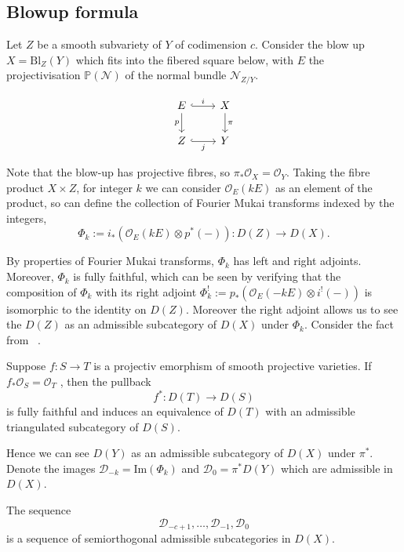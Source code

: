 \subsection{Blowup formula}

Let $Z$ be a smooth subvariety of $Y$ of codimension $c$. Consider the blow up $X = \mathrm{Bl}_{Z}(Y)$ which fits into the fibered square below, with $E$ the projectivisation $\mathbb{P} (\mathcal{N})$ of the normal bundle $\mathcal{N}_{Z/Y}$. 

\[\begin{tikzcd}[column sep=2.25em]
	{E } & X \\
	Z & {Y}
	\arrow["p"', from=1-1, to=2-1]
	\arrow["\pi", from=1-2, to=2-2]
	\arrow["i", hook, from=1-1, to=1-2]
	\arrow["j"', hook, from=2-1, to=2-2]
\end{tikzcd}\]

Note that the blow-up has projective fibres, so $\pi_{*}\mathcal{O}_{X}= \mathcal{O}_Y$. Taking the fibre product $X \times Z$, for integer $k$ we can consider $\mathcal{O}_{E}(kE)$ as an element of the product, so can define the collection of Fourier Mukai transforms indexed by the integers, $$\Phi_{k}:= i_{*}\left( \mathcal{O}_{E}(kE)\otimes p^{*}(- ) \right): D(Z)\to D(X).$$

By properties of Fourier Mukai transforms, $\Phi_k$ has left and right adjoints. Moreover, $\Phi_k$ is fully faithful, which can be seen by verifying that the composition of $\Phi_k$ with its right adjoint $\Phi_{k}^{!}:= p_{*}(\mathcal{O}_{E}(-kE)\otimes i^{!}(-))$ is isomorphic to the identity on $D(Z)$. Moreover the right adjoint allows us to see the $D(Z)$ as an admissible subcategory of $D(X)$ under $\Phi_k$. Consider the fact from ~\cite*{Huybrechts}.

\begin{proposition}{}{}
    Suppose $f: S \to T$ is a projectiv emorphism of smooth projective varieties. If $f_{*}\mathcal{O}_{S} = \mathcal{O}_T$ , then the pullback $$f^{*}: D(T)\to D(S)$$is fully faithful and induces an equivalence of $D(T)$ with an admissible triangulated subcategory of $D(S)$.
\end{proposition}

Hence we can see $D(Y)$ as an admissible subcategory of $D(X)$ under $\pi^*$. Denote the images $\mathcal{D}_{-k}=\mathrm{Im}(\Phi_{k})$ and $\mathcal{D}_{0}= \pi^{*}D(Y)$ which are admissible in $D(X)$. 

\begin{lemma}{}{}
    The sequence $$\mathcal{D}_{-c+1},\dots,\mathcal{D}_{-1},\mathcal{D}_0$$is a sequence of semiorthogonal admissible subcategories in $D(X)$.
\end{lemma}


